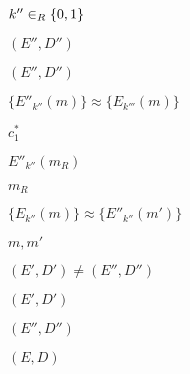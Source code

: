 \documentclass[10pt]{book}
\begin{document}
\begin{mdSnippets}
\begin{mdInlineSnippet}[1e2d14e4ca8007d5f5084930373884fa]%
$k'' \in_R \{0,1\}$\end{mdInlineSnippet}%
\begin{mdInlineSnippet}[bf1c3f008617dc19e2a47ac023e09625]%
$(E'',D'')$\end{mdInlineSnippet}%
\begin{mdInlineSnippet}[bf1c3f008617dc19e2a47ac023e09625]%
$(E'',D'')$\end{mdInlineSnippet}%
\begin{mdInlineSnippet}%
$\{ E''_{k''}(m) \} \approx \{ E_{k'''}(m) \}$\end{mdInlineSnippet}%
\begin{mdInlineSnippet}[9a2c9b266d59c87829a01a6aaeeed7c5]%
$c_1^*$\end{mdInlineSnippet}%
\begin{mdInlineSnippet}[ef38ee1a2ea71a158d4bdcf3392e3b30]%
$E''_{k''}(m_R)$\end{mdInlineSnippet}%
\begin{mdInlineSnippet}[565e88fabf0f61c16146eb55fc406793]%
$m_R$\end{mdInlineSnippet}%
\begin{mdInlineSnippet}[dbc362ff662273c737776967f4fd6e86]%
$\{E_{k''}(m)\} \approx \{E''_{k''}(m') \}$\end{mdInlineSnippet}%
\begin{mdInlineSnippet}[67db24c9d6367e147ee325c66a0a5bac]%
$m,m'$\end{mdInlineSnippet}%
\begin{mdInlineSnippet}%
$(E',D') \neq (E'',D'')$\end{mdInlineSnippet}%
\begin{mdInlineSnippet}%
$(E',D')$\end{mdInlineSnippet}%
\begin{mdInlineSnippet}[bf1c3f008617dc19e2a47ac023e09625]%
$(E'',D'')$\end{mdInlineSnippet}%
\begin{mdInlineSnippet}[c150726dc018e82825c0c3617f46a1c9]%
$(E,D)$\end{mdInlineSnippet}%

\end{mdSnippets}
\end{document}
